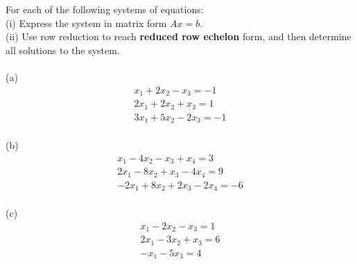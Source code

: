 \begin{question}	\normalfont
	
For each of the following systems of equations: \\

\noindent (i) Express the system in matrix form $Ax =b$. \\

\noindent (ii) 	Use row reduction to reach {\bf reduced row echelon} form,
and then  determine all solutions to the
system.  \\ \\	
	
\noindent (a) 	
\[
\begin{array}{r}
x_1 + 2x_2 - x_3 = -1\\ 
2x_1 + 2x_2 + x_3 = 1 \\
3x_1 + 5x_2 - 2x_3 = -1 \\
\end{array}
\]

\vspace{.2cm}

\noindent (b)
\[
\begin{array}{r}
x_1 - 4x_2 - x_3 + x_4 = 3 \\
2x_1 - 8 x_2 + x_3 -4x_4 = 9 \\
-2x_1 + 8 x_2 + 2x_3 -2x_4 = -6 \\
\end{array}
\]	

\vspace{.2cm}

\noindent (c) 
\[
\begin{array}{r}
x_1 -2x_2 -x_3 = 1\\
2x_1 - 3x_2 + x_3 = 6 \\
-x_1 -5x_3 = 4 \\
\end{array}
\]


\end{question}
